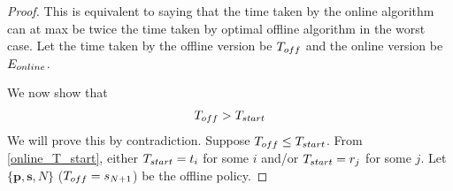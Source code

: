 \begin{proof}
This is equivalent to saying that the time taken by the online algorithm can at max be twice the time taken by optimal offline algorithm in the worst case. Let the time taken by the offline version be $T_{\mbox{\scriptsize{off}}}$ and the online version be $E_{\mbox{\scriptsize{online}}}$. 

We now show that 
\begin{align}
T_{\mbox{\scriptsize{off}}} > T_{\mbox{\scriptsize{start}}}
\label{online_time}
\end{align}
We will prove this by contradiction. Suppose $T_{\mbox{\scriptsize{off}}}\le T_{\mbox{\scriptsize{start}}}$. From \eqref{online_T_start}, either $T_{\mbox{\scriptsize{start}}}=t_i$ for some $i$ and/or $T_{\mbox{\scriptsize{start}}}=r_j$ for some $j$. Let $\{\textbf{p},\textbf{s},N\}$ ($T_{\mbox{\scriptsize{off}}}=s_{N+1}$) be the offline policy.


\end{proof}
